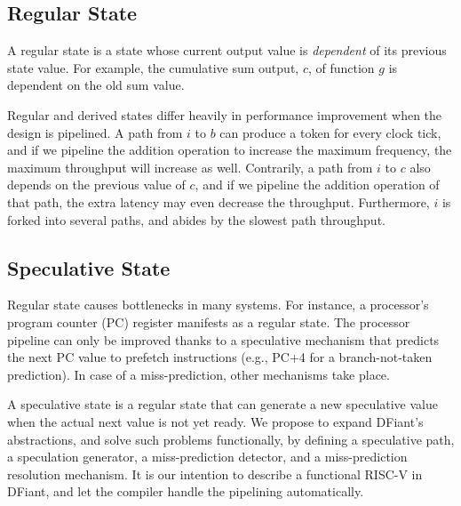 \subsection{Regular State} 
A regular state is a state whose current output value is \textit{dependent} of its previous state value. For example, the cumulative sum output, $c$, of function $g$ is dependent on the old sum value. 

Regular and derived states differ heavily in performance improvement when the design is pipelined. A path from $i$ to $b$ can produce a token for every clock tick, and if we pipeline the addition operation to increase the maximum frequency, the maximum throughput will increase as well. Contrarily, a path from $i$ to $c$ also depends on the previous value of $c$, and if we pipeline the addition operation of that path, the extra latency may even decrease the throughput. Furthermore, $i$ is forked into several paths, and  abides by the slowest path throughput. 

\subsection{Speculative State} 
Regular state causes bottlenecks in many systems. For instance, a processor's program counter (PC) register manifests as a regular state. The processor pipeline can only be improved thanks to a speculative mechanism that predicts the next PC value to prefetch instructions (e.g., PC+4 for a branch-not-taken prediction). In case of a miss-prediction, other mechanisms take place. 

A speculative state is a regular state that can generate a new speculative value when the actual next value is not yet ready. We propose to expand DFiant's abstractions, and solve such problems functionally, by defining a speculative path, a speculation generator, a miss-prediction detector, and a miss-prediction resolution mechanism. It is our intention to describe a functional RISC-V in DFiant, and let the compiler handle the pipelining automatically.

